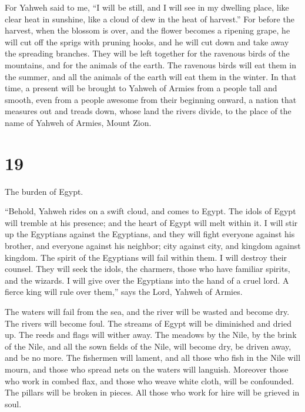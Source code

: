  For Yahweh said to me, ``I will be still, and I will see in
my dwelling place, like clear heat in sunshine, like a cloud of dew in
the heat of harvest.''  For before the harvest, when the
blossom is over, and the flower becomes a ripening grape, he will cut
off the sprigs with pruning hooks, and he will cut down and take away
the spreading branches.  They will be left together for the
ravenous birds of the mountains, and for the animals of the earth. The
ravenous birds will eat them in the summer, and all the animals of the
earth will eat them in the winter.  In that time, a present
will be brought to Yahweh of Armies from a people tall and smooth, even
from a people awesome from their beginning onward, a nation that
measures out and treads down, whose land the rivers divide, to the place
of the name of Yahweh of Armies, Mount Zion.

\hypertarget{section-18}{%
\section{19}\label{section-18}}

 The burden of Egypt.

``Behold, Yahweh rides on a swift cloud, and comes to Egypt. The idols
of Egypt will tremble at his presence; and the heart of Egypt will melt
within it.  I will stir up the Egyptians against the
Egyptians, and they will fight everyone against his brother, and
everyone against his neighbor; city against city, and kingdom against
kingdom.  The spirit of the Egyptians will fail within them.
I will destroy their counsel. They will seek the idols, the charmers,
those who have familiar spirits, and the wizards.  I will
give over the Egyptians into the hand of a cruel lord. A fierce king
will rule over them,'' says the Lord, Yahweh of Armies.

 The waters will fail from the sea, and the river will be
wasted and become dry.  The rivers will become foul. The
streams of Egypt will be diminished and dried up. The reeds and flags
will wither away.  The meadows by the Nile, by the brink of
the Nile, and all the sown fields of the Nile, will become dry, be
driven away, and be no more.  The fishermen will lament, and
all those who fish in the Nile will mourn, and those who spread nets on
the waters will languish.  Moreover those who work in combed
flax, and those who weave white cloth, will be confounded. 
The pillars will be broken in pieces. All those who work for hire will
be grieved in soul.

